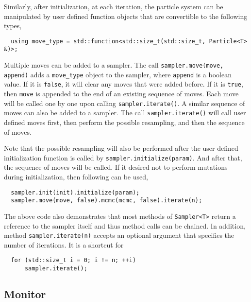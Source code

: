 Similarly, after initialization, at each iteration, the particle system can be
manipulated by user defined function objects that are convertible to the
following types,
\begin{Verbatim}
  using move_type = std::function<std::size_t(std::size_t, Particle<T> &)>;
\end{Verbatim}
Multiple moves can be added to a sampler. The call
\verb|sampler.move(move, append)| adds a \verb|move_type| object to the
sampler, where \verb|append| is a boolean value. If it is \verb|false|, it will
clear any moves that were added before. If it is \verb|true|, then \verb|move|
is appended to the end of an existing sequence of moves. Each move will be
called one by one upon calling \verb|sampler.iterate()|. A similar sequence of
\mcmc moves can also be added to a sampler. The call \verb|sampler.iterate()|
will call user defined moves first, then perform the possible resampling, and
then the sequence of \mcmc moves.

Note that the possible resampling will also be performed after the user defined
initialization function is called by \verb|sampler.initialize(param)|. And
after that, the sequence of \mcmc moves will be called. If it desired not to
perform mutations during initialization, then following can be used,
\begin{Verbatim}
  sampler.init(init).initialize(param);
  sampler.move(move, false).mcmc(mcmc, false).iterate(n);
\end{Verbatim}
The above code also demonstrates that most methods of \verb|Sampler<T>| return
a reference to the sampler itself and thus method calls can be chained. In
addition, method \verb|sampler.iterate(n)| accepts an optional argument that
specifies the number of iterations. It is a shortcut for
\begin{Verbatim}
  for (std::size_t i = 0; i != n; ++i)
      sampler.iterate();
\end{Verbatim}

\subsection{Monitor}
\label{sub:Monitor}

